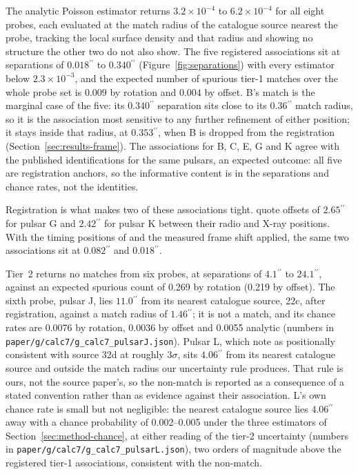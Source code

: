 \documentclass[11pt]{article}
\newcommand{\as}{\ensuremath{^{\prime\prime}}}
\begin{document}
The analytic Poisson estimator returns $3.2\times10^{-4}$ to $6.2\times10^{-4}$ for all eight probes, each evaluated at the match radius of the catalogue source nearest the probe, tracking the local surface density and that radius and showing no structure the other two do not also show. The five registered associations sit at separations of $0.018\as$ to $0.340\as$ (Figure~\ref{fig:separations}) with every estimator below $2.3\times10^{-3}$, and the expected number of spurious tier-1 matches over the whole probe set is $0.009$ by rotation and $0.004$ by offset. B's match is the marginal case of the five: its $0.340\as$ separation sits close to its $0.36\as$ match radius, so it is the association most sensitive to any further refinement of either position; it stays inside that radius, at $0.353\as$, when B is dropped from the registration (Section~\ref{sec:results-frame}). The associations for B, C, E, G and K agree with the published identifications for the same pulsars, an expected outcome: all five are registration anchors, so the informative content is in the separations and chance rates, not the identities.

Registration is what makes two of these associations tight. \citet{ZhaoHeinke2023} quote offsets of $2.65\as$ for pulsar G and $2.42\as$ for pulsar K between their radio and X-ray positions. With the timing positions of \citet{ColomiBernadich2026} and the measured frame shift applied, the same two associations sit at $0.082\as$ and $0.018\as$.

Tier~2 returns no matches from six probes, at separations of $4.1\as$ to $24.1\as$, against an expected spurious count of 0.269 by rotation (0.219 by offset). The sixth probe, pulsar J, lies $11.0\as$ from its nearest catalogue source, 22c, after registration, against a match radius of $1.46\as$; it is not a match, and its chance rates are 0.0076 by rotation, 0.0036 by offset and 0.0055 analytic (numbers in \texttt{paper/g/calc7/g\_calc7\_pulsarJ.json}). Pulsar L, which \citet{ColomiBernadich2026} note as positionally consistent with source 32d at roughly $3\sigma$, sits $4.06\as$ from its nearest catalogue source and outside the match radius our uncertainty rule produces. That rule is ours, not the source paper's, so the non-match is reported as a consequence of a stated convention rather than as evidence against their association. L's own chance rate is small but not negligible: the nearest catalogue source lies $4.06\as$ away with a chance probability of 0.002--0.005 under the three estimators of Section~\ref{sec:method-chance}, at either reading of the tier-2 uncertainty (numbers in \texttt{paper/g/calc7/g\_calc7\_pulsarL.json}), two orders of magnitude above the registered tier-1 associations, consistent with the non-match.
\end{document}
